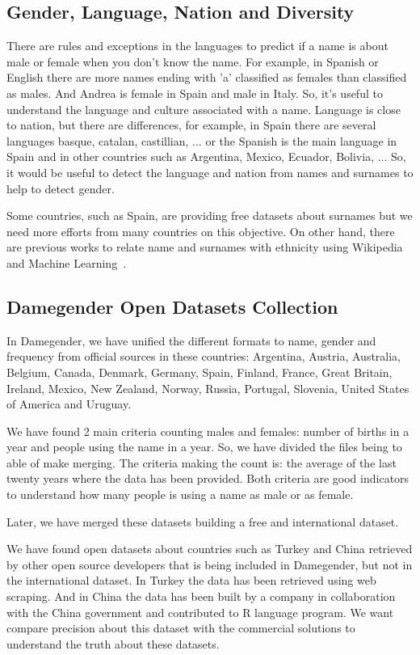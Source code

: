 \documentclass[a4paper]{article}
\begin{document}
\subsection{Gender, Language, Nation and Diversity}
\label{sec:diversity}

There are rules and exceptions in the languages to predict if a name
is about male or female when you don't know the name. For example, in
Spanish or English there are more names ending with 'a' classified as
females than classified as males. And Andrea is female in Spain and
male in Italy. So, it's useful to understand the language and culture
associated with a name. Language is close to nation, but there are
differences, for example, in Spain there are several languages basque,
catalan, castillian, ... or the Spanish is the main language in Spain
and in other countries such as Argentina, Mexico, Ecuador, Bolivia,
... So, it would be useful to detect the language and nation from
names and surnames to help to detect gender.

Some countries, such as Spain, are providing free datasets about
surnames but we need more efforts from many countries on this
objective. On other hand, there are previous works to relate name and
surnames with ethnicity using Wikipedia and Machine
Learning~\cite{ambekar2009name}.

\subsection{Damegender Open Datasets Collection}
\label{sec:damegender}

In Damegender, we have unified the different formats to name, gender
and frequency from official sources in these countries: Argentina,
Austria, Australia, Belgium, Canada, Denmark, Germany, Spain, Finland,
France, Great Britain, Ireland, Mexico, New Zealand, Norway, Russia,
Portugal, Slovenia, United States of America and Uruguay.

We have found 2 main criteria counting males and females: number of
births in a year and people using the name in a year. So, we have
divided the files being to able of make merging. The criteria making
the count is: the average of the last twenty years where the data has
been provided. Both criteria are good indicators to understand how
many people is using a name as male or as female.

Later, we have merged these datasets building a free and international
dataset.

We have found open datasets about countries such as Turkey and China
retrieved by other open source developers that is being included in
Damegender, but not in the international dataset. In Turkey the data
has been retrieved using web scraping. And in China the data has been
built by a company in collaboration with the China government and
contributed to R language program. We want compare precision about
this dataset with the commercial solutions to understand the truth
about these datasets.
\end{document}
